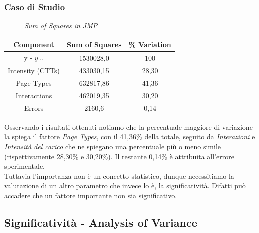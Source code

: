 \subsubsection{Caso di Studio}
\begin{figure}[H]
	\caption{\textit{Sum of Squares in JMP}}
\end{figure}
\begin{table}[h]
	\begin{center}
		\begin{tabular}{|c|c|c|}
			\hline
			Component & Sum of Squares & \% Variation\\
			\hline
			 \rule[-4mm]{0mm}{0.5cm}
			 y - {$\overline{y}_...$}   	& 1530028,0		   & 100\\
			 \rule[-4mm]{0mm}{0.5cm}
			 Intensity (CTTs) 		  & 433030,15		   & 28,30\\
			 \rule[-4mm]{0mm}{0.5cm}
			 Page-Types 		  & 632817,86		   & 41,36\\
			 \rule[-4mm]{0mm}{0.5cm}
			 Interactions		  & 462019,35		   & 30,20\\
			 \rule[-4mm]{0mm}{0.5cm}
			 Errors 		  & 2160,6		   & 0,14\\
			\hline
		\end{tabular}
	\end{center}
\end{table}
Osservando i risultati ottenuti notiamo che la percentuale maggiore di variazione la spiega il fattore \textit{Page Types}, con il 41,36\% della totale, seguito da \textit{Interazioni} e \textit{Intensità del carico} che ne spiegano una percentuale più o meno simile (rispettivamente 28,30\% e 30,20\%). Il restante 0,14\% è attribuita all'errore sperimentale.
\\
Tuttavia l'importanza non è un concetto statistico, dunque necessitiamo la valutazione di un altro parametro che invece lo è, la significatività.
Difatti può accadere che un fattore importante non sia significativo.
\subsection{Significatività - Analysis of Variance}
